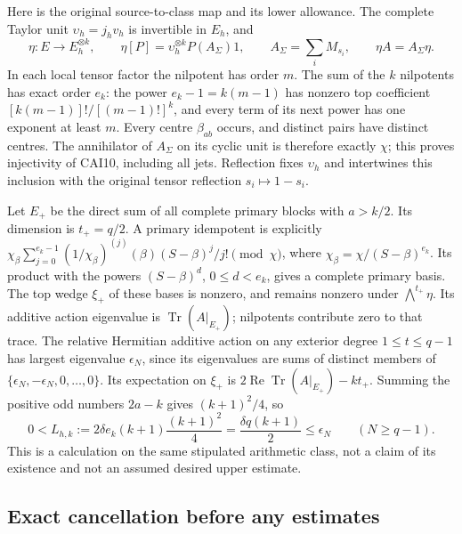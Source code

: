 \documentclass[11pt,a4paper]{article}
\begin{document}
Here is the original source-to-class map and its lower allowance. The
complete Taylor unit $\upsilon_h=j_hv_h$ is invertible in $E_h$, and
\[
 \eta:E\longrightarrow E_h^{\otimes k},\qquad
 \eta[P]=\upsilon_h^{\otimes k}P(A_\Sigma)1,\qquad
 A_\Sigma=\sum_iM_{s_i},\qquad \eta A=A_\Sigma\eta.\tag{CAI10}
\]
In each local tensor factor the nilpotent has order $m$. The sum of the
$k$ nilpotents has exact order $e_k$: the power $e_k-1=k(m-1)$ has
nonzero top coefficient $[k(m-1)]!/[(m-1)!]^k$, and every term of its
next power has one exponent at least $m$. Every centre $\beta_{ab}$
occurs, and distinct pairs have distinct centres. The annihilator of
$A_\Sigma$ on its cyclic unit is therefore exactly $\chi$; this proves
injectivity of CAI10, including all jets. Reflection fixes
$\upsilon_h$ and intertwines this inclusion with the original tensor
reflection $s_i\mapsto1-s_i$.

Let $E_+$ be the direct sum of all complete primary blocks with $a>k/2$.
Its dimension is $t_+=q/2$. A primary idempotent is explicitly
$\chi_\beta\sum_{j=0}^{e_k-1}(1/\chi_\beta)^{(j)}(\beta)
(S-\beta)^j/j!\pmod\chi$, where $\chi_\beta=\chi/(S-\beta)^{e_k}$.
Its product with the powers $(S-\beta)^d$, $0\le d<e_k$, gives a
complete primary basis. The top wedge $\xi_+$ of these bases is nonzero,
and remains nonzero under $\bigwedge^{t_+}\eta$. Its additive action
eigenvalue is $\operatorname{Tr}(A|_{E_+})$; nilpotents contribute zero
to that trace. The relative Hermitian additive action on any exterior
degree $1\le t\le q-1$ has largest eigenvalue $\epsilon_N$, since its
eigenvalues are sums of distinct members of
$\{\epsilon_N,-\epsilon_N,0,\ldots,0\}$. Its expectation on $\xi_+$
is $2\operatorname{Re}\operatorname{Tr}(A|_{E_+})-kt_+$. Summing the
positive odd numbers $2a-k$ gives $(k+1)^2/4$, so
\[
 0<L_{h,k}:=2\delta e_k(k+1)\frac{(k+1)^2}{4}
          =\frac{\delta q(k+1)}2\le\epsilon_N
          \qquad(N\ge q-1).\tag{CAI11}
\]
This is a calculation on the same stipulated arithmetic class, not a
claim of its existence and not an assumed desired upper estimate.

\subsection{Exact cancellation before any estimates}
\end{document}
